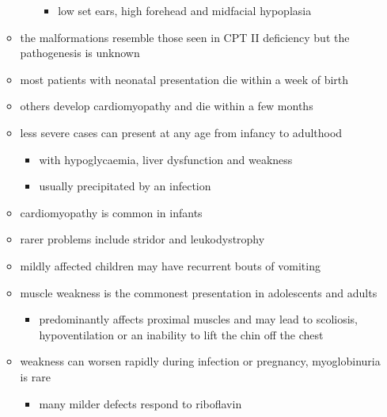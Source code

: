 \documentclass{scrartcl}
\begin{document}
\begin{enumerate}
\begin{itemize}
\begin{itemize}
\begin{itemize}
\item low set ears, high forehead and midfacial hypoplasia
\end{itemize}
\end{itemize}
\item the malformations resemble those seen in CPT II deficiency but the pathogenesis is unknown
\item most patients with neonatal presentation die within a week of birth
\item others develop cardiomyopathy and die within a few months
\item less severe cases can present at any age from infancy to adulthood
\begin{itemize}
\item with hypoglycaemia, liver dysfunction and weakness
\item usually precipitated by an infection
\end{itemize}
\item cardiomyopathy is common in infants
\item rarer problems include stridor and leukodystrophy
\item mildly affected children may have recurrent bouts of vomiting
\item muscle weakness is the commonest presentation in adolescents and adults
\begin{itemize}
\item predominantly affects proximal muscles and may lead to scoliosis,
hypoventilation or an inability to lift the chin off the chest
\end{itemize}
\item weakness can worsen rapidly during infection or pregnancy, myoglobinuria is rare
\begin{itemize}
\item many milder defects respond to riboflavin
\end{itemize}
\end{itemize}
\end{enumerate}
\end{document}
